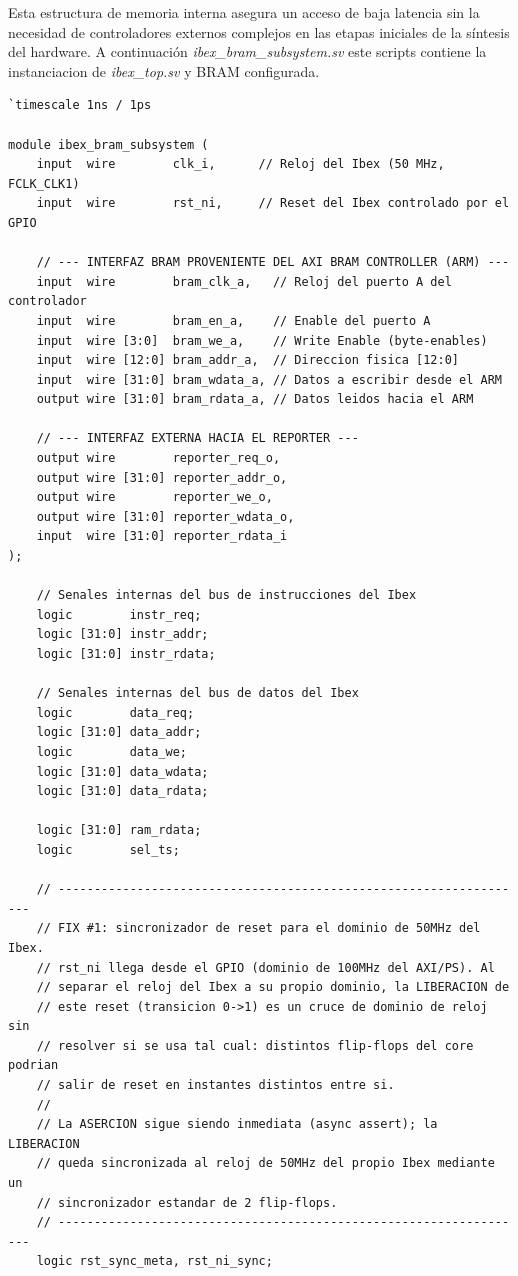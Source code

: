 Esta estructura de memoria interna asegura un acceso de baja latencia sin la necesidad de controladores externos complejos en las etapas iniciales de la síntesis del hardware.
A continuación \textit{ibex\_bram\_subsystem.sv} este scripts contiene la instanciacion de \textit{ibex\_top.sv} y BRAM configurada.

\begin{lstlisting}[style=verilogstyle, basicstyle=\ttfamily\footnotesize, caption={Codigo fuente del subsistema \texttt{ibex\_bram\_subsystem.sv}}, label={code:ibex_bram_subsystem}]
`timescale 1ns / 1ps

module ibex_bram_subsystem (
    input  wire        clk_i,      // Reloj del Ibex (50 MHz, FCLK_CLK1)
    input  wire        rst_ni,     // Reset del Ibex controlado por el GPIO

    // --- INTERFAZ BRAM PROVENIENTE DEL AXI BRAM CONTROLLER (ARM) ---
    input  wire        bram_clk_a,   // Reloj del puerto A del controlador
    input  wire        bram_en_a,    // Enable del puerto A
    input  wire [3:0]  bram_we_a,    // Write Enable (byte-enables)
    input  wire [12:0] bram_addr_a,  // Direccion fisica [12:0]
    input  wire [31:0] bram_wdata_a, // Datos a escribir desde el ARM
    output wire [31:0] bram_rdata_a, // Datos leidos hacia el ARM

    // --- INTERFAZ EXTERNA HACIA EL REPORTER ---
    output wire        reporter_req_o,
    output wire [31:0] reporter_addr_o,
    output wire        reporter_we_o,
    output wire [31:0] reporter_wdata_o,
    input  wire [31:0] reporter_rdata_i
);

    // Senales internas del bus de instrucciones del Ibex
    logic        instr_req;
    logic [31:0] instr_addr;
    logic [31:0] instr_rdata;

    // Senales internas del bus de datos del Ibex
    logic        data_req;
    logic [31:0] data_addr;
    logic        data_we;
    logic [31:0] data_wdata;
    logic [31:0] data_rdata;

    logic [31:0] ram_rdata;
    logic        sel_ts;

    // ------------------------------------------------------------------
    // FIX #1: sincronizador de reset para el dominio de 50MHz del Ibex.
    // rst_ni llega desde el GPIO (dominio de 100MHz del AXI/PS). Al
    // separar el reloj del Ibex a su propio dominio, la LIBERACION de
    // este reset (transicion 0->1) es un cruce de dominio de reloj sin
    // resolver si se usa tal cual: distintos flip-flops del core podrian
    // salir de reset en instantes distintos entre si.
    //
    // La ASERCION sigue siendo inmediata (async assert); la LIBERACION
    // queda sincronizada al reloj de 50MHz del propio Ibex mediante un
    // sincronizador estandar de 2 flip-flops.
    // ------------------------------------------------------------------
    logic rst_sync_meta, rst_ni_sync;


\end{lstlisting}
